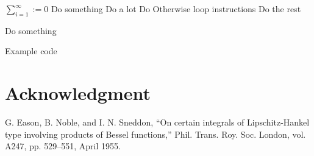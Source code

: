 \documentclass[conference]{IEEEtran}
\begin{document}
\begin{algorithm}
\DontPrintSemicolon
  
  $\sum_{i=1}^{\infty} := 0$ 
    {
        Do something    
        {Do a lot}
    }
    {
    	Do Otherwise \;
        { 
        	loop instructions
        }
    }
    \Else
    {
    	Do the rest
    }
    
   {
   		Do something\;
   }

\caption{Example code}
\end{algorithm}

\section*{Acknowledgment}


\begin{thebibliography}{00}
 G. Eason, B. Noble, and I. N. Sneddon, ``On certain integrals of Lipschitz-Hankel type involving products of Bessel functions,'' Phil. Trans. Roy. Soc. London, vol. A247, pp. 529--551, April 1955.
\end{thebibliography}
\vspace{12pt}
\end{document}
